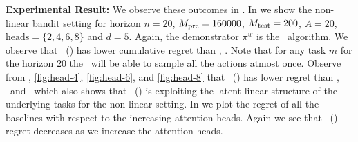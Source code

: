 \textbf{Experimental Result:} We observe these outcomes in . In  we show the non-linear bandit setting for horizon $n=20$, $M_{\text{pre}} =  160000$, $M_{\text{test}} = 200$, $A=20$, $\mathrm{heads}=\{2, 4, 6, 8\}$ and $d=5$. 
%
%
Again, the demonstrator $\pi^w$ is the \ts\ algorithm. We observe that \pred\ (\gt) has lower cumulative regret than \dptg, \ad. Note that for any task $m$ for the horizon $20$ the \ts\ will be able to sample all the actions atmost once.
%
%
Observe from , \ref{fig:head-4}, \ref{fig:head-6}, and \ref{fig:head-8} that \pred\ (\gt) has lower regret than \ad, \ts\ and \linucb\ which also shows that \pred\ (\gt) is exploiting the latent linear structure of the underlying tasks for the non-linear setting.
%
%
In  we plot the regret of all the baselines with respect to the increasing attention heads. Again we see that \pred\ (\gt) regret decreases as we increase the attention heads. 


